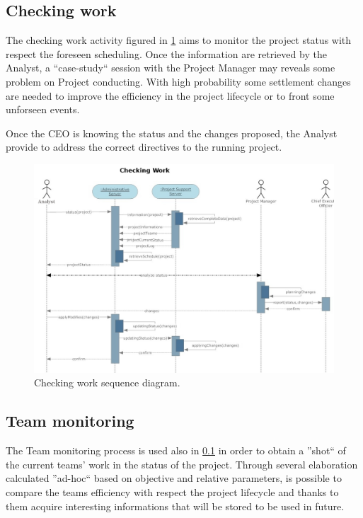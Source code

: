 \subsection{Checking work}
\label{subsec:checking}
The checking work activity figured in \ref{3img:[sequence]checking} aims to monitor the project status with respect the foreseen scheduling. Once the information are retrieved by the Analyst, a ``case-study`` session with the Project Manager may reveals some problem on Project conducting. With high probability some settlement changes are needed to improve the efficiency in the project lifecycle or to front some unforseen events.

Once the CEO is knowing the status and the changes proposed, the Analyst provide to address the correct directives to the running project.

\begin{figure}[H]
\begin{centering}
\includegraphics[scale=0.35]{assign3/sdraw/imgs/checking.jpg}
\caption{Checking work sequence diagram.}
\label{3img:[sequence]checking}
\end{centering}
\end{figure}


\subsection{Team monitoring}
The Team monitoring process is used also in \ref{subsec:checking} in order to obtain a ''shot`` of the current teams' work in the status of the project. Through several elaboration calculated ''ad-hoc`` based on objective and relative parameters, is possible to compare the teams efficiency with respect the project lifecycle and thanks to them acquire interesting informations that will be stored to be used in future.

